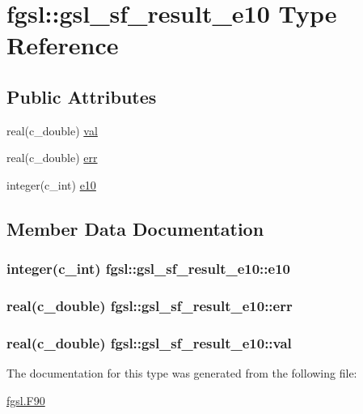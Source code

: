 \hypertarget{structfgsl_1_1gsl__sf__result__e10}{\section{fgsl\-:\-:gsl\-\_\-sf\-\_\-result\-\_\-e10 Type Reference}
\label{structfgsl_1_1gsl__sf__result__e10}
}
\subsection*{Public Attributes}
\begin{DoxyCompactItemize}
\item 
real(c\-\_\-double) \hyperlink{structfgsl_1_1gsl__sf__result__e10_acb74f78fcd7f067d10432958045ebe8b}{val}
\item 
real(c\-\_\-double) \hyperlink{structfgsl_1_1gsl__sf__result__e10_a245eaaf8dd79ae30494173be913e4c69}{err}
\item 
integer(c\-\_\-int) \hyperlink{structfgsl_1_1gsl__sf__result__e10_aced4fab828ae664ee5aa475fa8a713d6}{e10}
\end{DoxyCompactItemize}


\subsection{Member Data Documentation}
\hypertarget{structfgsl_1_1gsl__sf__result__e10_aced4fab828ae664ee5aa475fa8a713d6}{
\subsubsection[{e10}]{\setlength{\rightskip}{0pt plus 5cm}integer(c\-\_\-int) fgsl\-::gsl\-\_\-sf\-\_\-result\-\_\-e10\-::e10}}\label{structfgsl_1_1gsl__sf__result__e10_aced4fab828ae664ee5aa475fa8a713d6}
\hypertarget{structfgsl_1_1gsl__sf__result__e10_a245eaaf8dd79ae30494173be913e4c69}{
\subsubsection[{err}]{\setlength{\rightskip}{0pt plus 5cm}real(c\-\_\-double) fgsl\-::gsl\-\_\-sf\-\_\-result\-\_\-e10\-::err}}\label{structfgsl_1_1gsl__sf__result__e10_a245eaaf8dd79ae30494173be913e4c69}
\hypertarget{structfgsl_1_1gsl__sf__result__e10_acb74f78fcd7f067d10432958045ebe8b}{
\subsubsection[{val}]{\setlength{\rightskip}{0pt plus 5cm}real(c\-\_\-double) fgsl\-::gsl\-\_\-sf\-\_\-result\-\_\-e10\-::val}}\label{structfgsl_1_1gsl__sf__result__e10_acb74f78fcd7f067d10432958045ebe8b}


The documentation for this type was generated from the following file\-:\begin{DoxyCompactItemize}
\item 
\hyperlink{fgsl_8F90}{fgsl.\-F90}\end{DoxyCompactItemize}
